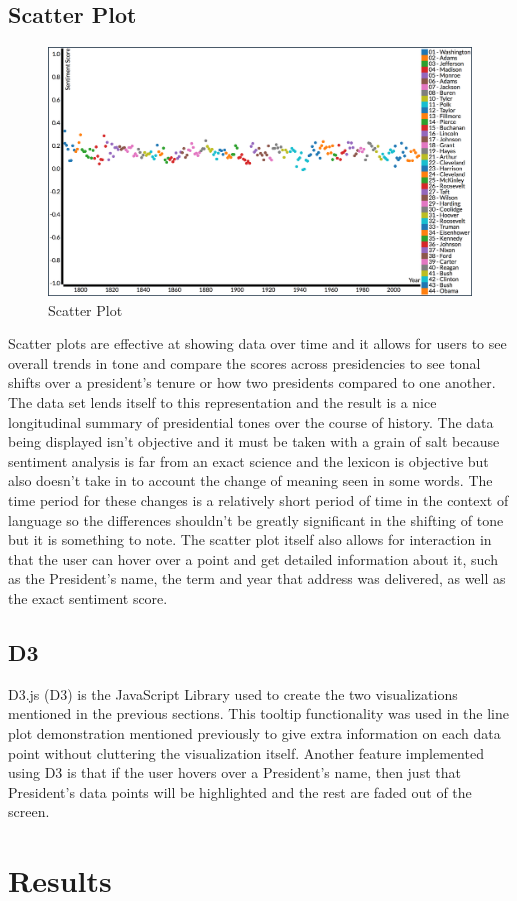 \subsection{Scatter Plot}
\begin{figure}
  \includegraphics[width=\columnwidth]{images/Lineplot.png}
  \caption{Scatter Plot}
  \label{fig:lineplot1}
\end{figure}
Scatter plots are effective at showing data over time and it allows for users to see overall trends in tone and compare the scores across presidencies to see tonal shifts over a president's tenure or how two presidents compared to one another.
The data set lends itself to this representation and the result is a nice longitudinal summary of presidential tones over the course of history.
The data being displayed isn't objective and it must be taken with a grain of salt because sentiment analysis is far from an exact science and the lexicon is objective but also doesn't take in to account the change of meaning seen in some words.
The time period for these changes is a relatively short period of time in the context of language so the differences shouldn't be greatly significant in the shifting of tone but it is something to note.
The scatter plot itself also allows for interaction in that the user can hover over a point and get detailed information about it, such as the President's name, the term and year that address was delivered, as well as the exact sentiment score.

\subsection{D3}
D3.js (D3) is the JavaScript Library used to create the two visualizations mentioned in the previous sections.
This tooltip functionality was used in the line plot demonstration mentioned previously to give extra information on each data point without cluttering the visualization itself.
Another feature implemented using D3 is that if the user hovers over a President's name, then just that President's data points will be highlighted and the rest are faded out of the screen.

\section{Results}
